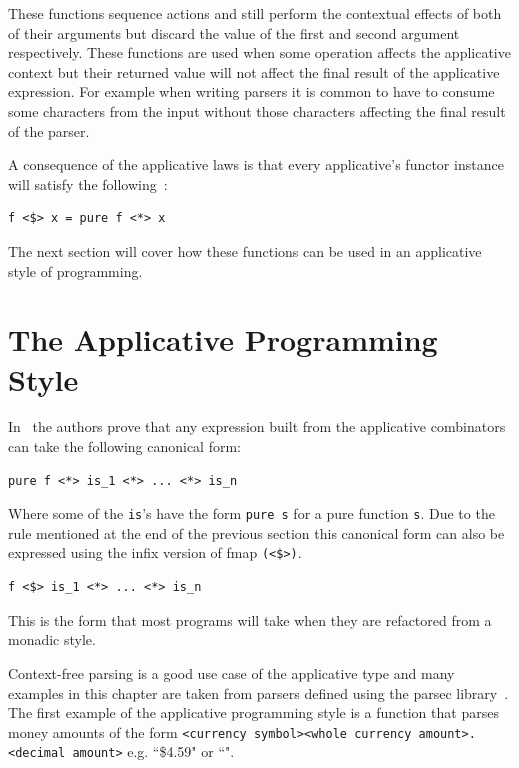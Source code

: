 These functions sequence actions and still perform the contextual effects of both of their arguments but discard the value of the first and second argument respectively. These functions are used when some operation affects the applicative context but their returned value will not affect the final result of the applicative expression. For example when writing parsers it is common to have to consume some characters from the input without those characters affecting the final result of the parser.

A consequence of the applicative laws is that every applicative's functor instance will satisfy the following~\citep{control.applicative}: 

\begin{lstlisting}[frame=tblr]
f <$> x = pure f <*> x
\end{lstlisting}

The next section will cover how these functions can be used in an applicative style of programming. 

\section{The Applicative Programming Style}
\label{sec:appProgStyle}

In~\cite{mcbrideIdioms} the authors prove that any expression built from the applicative combinators can take the following canonical form:

\begin{lstlisting}[frame=tblr]
pure f <*> is_1 <*> ... <*> is_n
\end{lstlisting}


Where some of the \texttt{is}'s have the form \texttt{pure s} for a pure function \texttt{s}. Due to the rule mentioned at the end of the previous section this canonical form can also be expressed using the infix version of fmap \texttt{(<\$>)}. 

\begin{lstlisting}[frame=tblr]
f <$> is_1 <*> ... <*> is_n
\end{lstlisting}

This is the form that most programs will take when they are refactored from a monadic style. 


 Context-free parsing is a good use case of the applicative type and many examples in this chapter are taken from parsers defined using the parsec library~\citep{parsec}. The first example of the applicative programming style is a function that parses money amounts of the form \texttt{<currency symbol><whole currency amount>.<decimal amount>} e.g. ``\$4.59" or ``".
 
